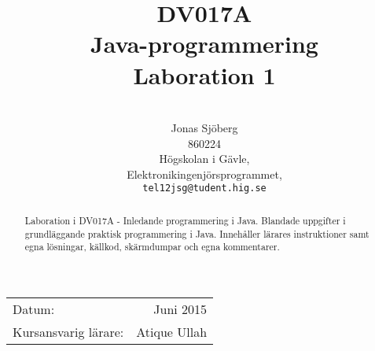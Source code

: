 \documentclass[11pt,a4paper]{article}
\title{DV017A \\ Java-programmering \\ Laboration 1}
\author{\\
  Jonas Sjöberg\\
  860224\\
  Högskolan i Gävle,\\
  Elektronikingenjörsprogrammet,\\
  \texttt{tel12jsg@tudent.hig.se}
}
\date{}
\begin{document}
    \maketitle

    \begin{center}
    \begin{tabular}{l r}
        Datum: & Juni 2015 \\
        Kursansvarig lärare: & Atique Ullah
    \end{tabular}
    \end{center}

    \begin{abstract}
        Laboration i DV017A - Inledande programmering i Java. Blandade uppgifter i grundläggande praktisk programmering i Java. Innehåller lärares instruktioner samt egna lösningar, källkod, skärmdumpar och egna kommentarer.
    \end{abstract}

    \newpage
    \setcounter{tocdepth}{3}
    \tableofcontents
    \newpage

%   
    
    
    
    
    
    
    
    
    
    
%   

    \newpage

    
\end{document}
